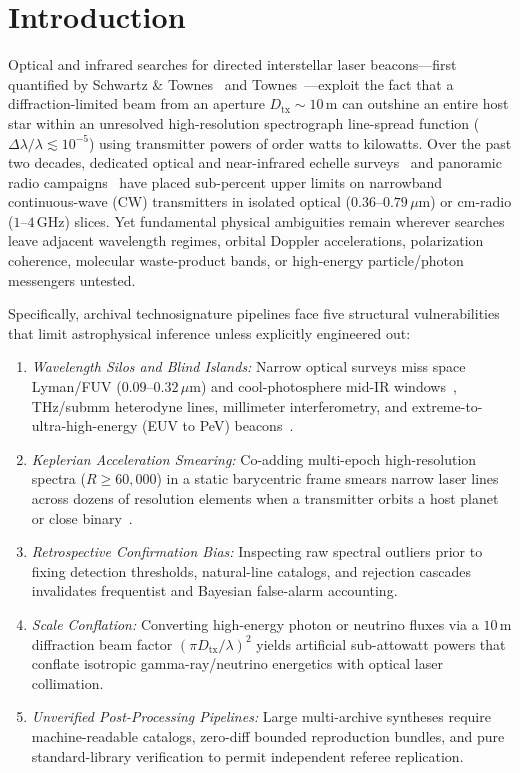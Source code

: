 \documentclass[twocolumn,10pt]{article}
\begin{document}
\section{Introduction}
Optical and infrared searches for directed interstellar laser beacons---first quantified by Schwartz \& Townes~\cite{SchwartzTownes1961} and Townes~\cite{Townes1983}---exploit the fact that a diffraction-limited beam from an aperture $D_{\mathrm{tx}} \sim 10\,\mathrm{m}$ can outshine an entire host star within an unresolved high-resolution spectrograph line-spread function ($\Delta\lambda/\lambda \lesssim 10^{-5}$) using transmitter powers of order watts to kilowatts. Over the past two decades, dedicated optical and near-infrared echelle surveys~\cite{ReinesMarcy2002,Howard2004,TellisMarcy2015,TellisMarcy2017,Lipman2019,Maire2019,Marcy2022,Zuckerman2023} and panoramic radio campaigns~\cite{Enriquez2017,Price2020,Sheikh2020} have placed sub-percent upper limits on narrowband continuous-wave (CW) transmitters in isolated optical ($0.36\text{--}0.79\,\mu\text{m}$) or cm-radio ($1\text{--}4\,\mathrm{GHz}$) slices. Yet fundamental physical ambiguities remain wherever searches leave adjacent wavelength regimes, orbital Doppler accelerations, polarization coherence, molecular waste-product bands, or high-energy particle/photon messengers untested.

Specifically, archival technosignature pipelines face five structural vulnerabilities that limit astrophysical inference unless explicitly engineered out:
\begin{enumerate}
  \item \textit{Wavelength Silos and Blind Islands:} Narrow optical surveys miss space Lyman/FUV ($0.09\text{--}0.32\,\mu\text{m}$) and cool-photosphere mid-IR windows~\cite{Kaltenegger2021,HaqqMisra2022}, THz/submm heterodyne lines, millimeter interferometry, and extreme-to-ultra-high-energy (EUV to PeV) beacons~\cite{Harris1986,Lacki2015}.
  \item \textit{Keplerian Acceleration Smearing:} Co-adding multi-epoch high-resolution spectra ($R \ge 60{,}000$) in a static barycentric frame smears narrow laser lines across dozens of resolution elements when a transmitter orbits a host planet or close binary~\cite{Sheikh2020,Davenport2022}.
  \item \textit{Retrospective Confirmation Bias:} Inspecting raw spectral outliers prior to fixing detection thresholds, natural-line catalogs, and rejection cascades invalidates frequentist and Bayesian false-alarm accounting.
  \item \textit{Scale Conflation:} Converting high-energy photon or neutrino fluxes via a $10\,\mathrm{m}$ diffraction beam factor $(\pi D_{\mathrm{tx}}/\lambda)^2$ yields artificial sub-attowatt powers that conflate isotropic gamma-ray/neutrino energetics with optical laser collimation.
  \item \textit{Unverified Post-Processing Pipelines:} Large multi-archive syntheses require machine-readable catalogs, zero-diff bounded reproduction bundles, and pure standard-library verification to permit independent referee replication.
\end{enumerate}
\end{document}
